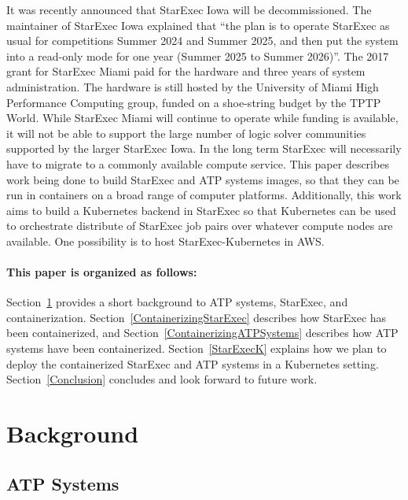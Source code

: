 \documentclass{easychair}
\begin{document}
It was recently announced that StarExec Iowa will be decommissioned. 
The maintainer of StarExec Iowa explained that ``the plan is to operate StarExec as usual for 
competitions Summer 2024 and Summer 2025, and then put the system into a read-only mode for one 
year (Summer 2025 to Summer 2026)''.
The 2017 grant for StarExec Miami paid for the hardware and three years of system administration.
The hardware is still hosted by the University of Miami High Performance Computing group,
funded on a shoe-string budget by the TPTP World.
While StarExec Miami will continue to operate while funding is available, it will not be able
to support the large number of logic solver communities supported by the larger StarExec Iowa.
In the long term StarExec will necessarily have to migrate to a commonly available compute service.
This paper describes work being done to build StarExec and ATP systems images, so that they 
can be run in containers on a broad range of computer platforms.
Additionally, this work aims to build a Kubernetes backend in StarExec so that Kubernetes can
be used to orchestrate distribute of StarExec job pairs over whatever compute nodes are available.
One possibility is to host StarExec-Kubernetes in AWS.

\paragraph{This paper is organized as follows:}
Section~\ref{Background} provides a short background to ATP systems, StarExec, and 
containerization.
Section~\ref{ContainerizingStarExec} describes how StarExec has been containerized, and
Section~\ref{ContainerizingATPSystems} describes how ATP systems have been containerized.
Section~\ref{StarExecK} explains how we plan to deploy the containerized StarExec
and ATP systems in a Kubernetes setting.
Section~\ref{Conclusion} concludes and look forward to future work.

\section{Background}
\label{Background}

\subsection{ATP Systems}
\label{ATPSystems}
\end{document}
